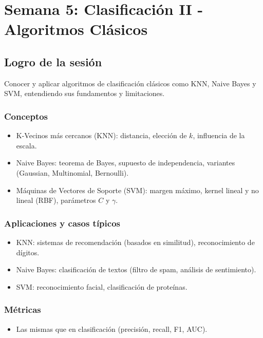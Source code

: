 \documentclass[12pt,a4paper,openany,oneside]{book}
\begin{document}
\chapter{Semana 5: Clasificación II - Algoritmos Clásicos}

\section{Logro de la sesión}
Conocer y aplicar algoritmos de clasificación clásicos como KNN, Naive Bayes y SVM, entendiendo sus fundamentos y limitaciones.

\subsection{Conceptos}
\begin{itemize}
    \item K-Vecinos más cercanos (KNN): distancia, elección de $k$, influencia de la escala.
    \item Naive Bayes: teorema de Bayes, supuesto de independencia, variantes (Gaussian, Multinomial, Bernoulli).
    \item Máquinas de Vectores de Soporte (SVM): margen máximo, kernel lineal y no lineal (RBF), parámetros $C$ y $\gamma$.
\end{itemize}

\subsection{Aplicaciones y casos típicos}
\begin{itemize}
    \item KNN: sistemas de recomendación (basados en similitud), reconocimiento de dígitos.
    \item Naive Bayes: clasificación de textos (filtro de spam, análisis de sentimiento).
    \item SVM: reconocimiento facial, clasificación de proteínas.
\end{itemize}

\subsection{Métricas}
\begin{itemize}
    \item Las mismas que en clasificación (precisión, recall, F1, AUC).
\end{itemize}
\end{document}
